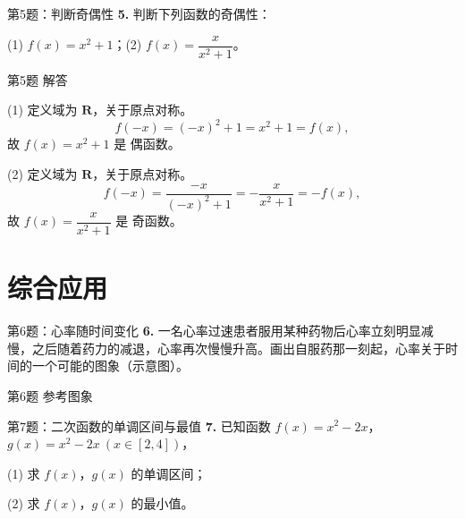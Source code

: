 \documentclass[10pt,aspectratio=169,serif,fleqn]{beamer}
\begin{document}
\begin{frame}[t]{第5题：判断奇偶性}
\textbf{5.} 判断下列函数的奇偶性：

\vspace{0.5em}
(1) $f(x)=x^2+1$；\hfil (2) $f(x)=\dfrac{x}{x^2+1}$。
\end{frame}

\begin{frame}[t]{第5题 解答}
\begin{tcolorbox}[colback=orange!10,colframe=orange,title=\textbf{解}]
(1) 定义域为 $\mathbf{R}$，关于原点对称。
\[
f(-x)=(-x)^2+1=x^2+1=f(x),
\]
故 $f(x)=x^2+1$ 是 \alert{偶函数}。

\vspace{0.8em}
(2) 定义域为 $\mathbf{R}$，关于原点对称。
\[
f(-x)=\frac{-x}{(-x)^2+1}=-\frac{x}{x^2+1}=-f(x),
\]
故 $f(x)=\dfrac{x}{x^2+1}$ 是 \alert{奇函数}。
\end{tcolorbox}
\end{frame}

\section{综合应用}
\begin{frame}[t]{第6题：心率随时间变化}
\textbf{6.} 一名心率过速患者服用某种药物后心率立刻明显减慢，之后随着药力的减退，心率再次慢慢升高。画出自服药那一刻起，心率关于时间的一个可能的图象（示意图）。
\end{frame}

\begin{frame}[t]{第6题 参考图象}
\begin{center}
\end{center}
\end{frame}

\begin{frame}[t]{第7题：二次函数的单调区间与最值}
\textbf{7.} 已知函数 $f(x)=x^2-2x$，$g(x)=x^2-2x\ (x\in[2,4])$，

(1) 求 $f(x)$，$g(x)$ 的单调区间；

(2) 求 $f(x)$，$g(x)$ 的最小值。
\end{frame}
\end{document}
